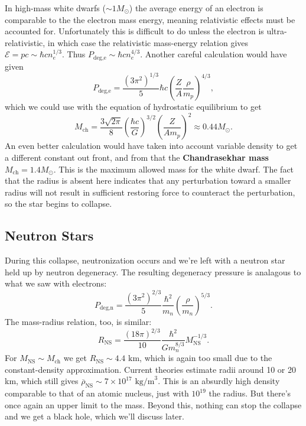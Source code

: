 \documentclass[../a062main.tex]{subfiles}
\begin{document}
In high-mass white dwarfs ($\sim 1M_\odot$) the average energy of an electron is comparable to the the electron mass energy, meaning relativistic effects must be accounted for.
Unfortunately this is difficult to do unless the electron is ultra-relativistic, in which case the relativistic mass-energy relation gives $\mathcal{E} = pc \sim \hbar c n_e^{1 / 3}$.
Thus $P_\textrm{deg,e} \sim \hbar c n_e^{4 / 3}$.
Another careful calculation would have given
\[ P_\textrm{deg,e} = \frac{(3\pi^2)^{1 / 3}}{5} \hbar c \left( \frac{Z}{A} \frac{\rho}{m_p} \right)^{4 / 3}, \]
which we could use with the equation of hydrostatic equilibrium to get
\[ M_\textrm{ch} = \frac{3 \sqrt{2\pi}}{8} \left( \frac{\hbar c}{G} \right)^{3 / 2} \left( \frac{Z}{A m_p} \right)^2 \approx 0.44M_\odot. \]
An even better calculation would have taken into account variable density to get a different constant out front, and from that the \textbf{Chandrasekhar mass} $M_\textrm{ch} = 1.4 M_\odot$.
This is the maximum allowed mass for the white dwarf.
The fact that the radius is absent here indicates that any perturbation toward a smaller radius will not result in sufficient restoring force to counteract the perturbation, so the star begins to collapse.

\subsection*{Neutron Stars}
During this collapse, neutronization occurs and we're left with a neutron star held up by neutron degeneracy.
The resulting degeneracy pressure is analagous to what we saw with electrons:
\[ P_\textrm{deg,n} = \frac{(3\pi^2)^{2 / 3}}{5} \frac{\hbar^2}{m_n} \left( \frac{\rho}{m_n} \right)^{5 / 3}. \]
The mass-radius relation, too, is similar:
\[ R_\textrm{NS} = \frac{(18\pi)^{2 / 3}}{10} \frac{\hbar^2}{G m_n^{8 / 3}} M_\textrm{NS}^{-1 / 3}. \]
For $M_\textrm{NS} \sim M_\textrm{ch}$ we get $R_\textrm{NS} \sim 4.4 \text{ km}$, which is again too small due to the constant-density approximation.
Current theories estimate radii around 10 or 20 km, which still gives $\overline{\rho}_\textrm{NS} \sim 7 \times 10^{17} \text{ kg/m}^3$.
This is an absurdly high density comparable to that of an atomic nucleus, just with $10^{19}$ the radius.
But there's once again an upper limit to the mass.
Beyond this, nothing can stop the collapse and we get a black hole, which we'll discuss later.
\end{document}
